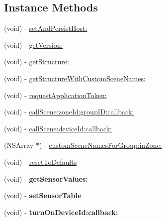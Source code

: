 \subsection*{Instance Methods}
\begin{DoxyCompactItemize}
\item 
(void) -\/ \hyperlink{interface_m_d_d_s_s_manager_a7fc82977a968af77139dfd04e407a242}{set\-And\-Persist\-Host\-:}
\item 
(void) -\/ \hyperlink{interface_m_d_d_s_s_manager_a74358d521e85fc2a1a04f15bd8b3954e}{get\-Version\-:}
\item 
(void) -\/ \hyperlink{interface_m_d_d_s_s_manager_a372f9b7faa41788df9a0051cbb3001d6}{get\-Structure\-:}
\item 
(void) -\/ \hyperlink{interface_m_d_d_s_s_manager_af23ff713c6f0860924c0fa55cff11acd}{get\-Structure\-With\-Custom\-Scene\-Names\-:}
\item 
(void) -\/ \hyperlink{interface_m_d_d_s_s_manager_a132057831e843d4888c44f7147ad28a1}{request\-Application\-Token\-:}
\item 
(void) -\/ \hyperlink{interface_m_d_d_s_s_manager_a5380dc94b95172a6131901f23a73bd7d}{call\-Scene\-:zone\-Id\-:group\-I\-D\-:callback\-:}
\item 
(void) -\/ \hyperlink{interface_m_d_d_s_s_manager_a33e9c999b7b7547d42c4102097102ee8}{call\-Scene\-:device\-Id\-:callback\-:}
\item 
(N\-S\-Array $\ast$) -\/ \hyperlink{interface_m_d_d_s_s_manager_a879391644298f08b9dd399d69dc5b137}{custom\-Scene\-Names\-For\-Group\-:in\-Zone\-:}
\item 
(void) -\/ \hyperlink{interface_m_d_d_s_s_manager_afd4b532e4a25c628ff150eb2199515da}{reset\-To\-Defaults}
\item 
\hypertarget{interface_m_d_d_s_s_manager_aafaa7083382f6e128205d821f6adeacd}{(void) -\/ {\bfseries get\-Sensor\-Values\-:}}\label{interface_m_d_d_s_s_manager_aafaa7083382f6e128205d821f6adeacd}

\item 
\hypertarget{interface_m_d_d_s_s_manager_a88e46a8084e45775c057a1849c046ed5}{(void) -\/ {\bfseries set\-Sensor\-Table}}\label{interface_m_d_d_s_s_manager_a88e46a8084e45775c057a1849c046ed5}

\item 
\hypertarget{interface_m_d_d_s_s_manager_a13132214fe9bb3b269804c68f880707f}{(void) -\/ {\bfseries turn\-On\-Device\-Id\-:callback\-:}}\label{interface_m_d_d_s_s_manager_a13132214fe9bb3b269804c68f880707f}


\end{DoxyCompactItemize}
